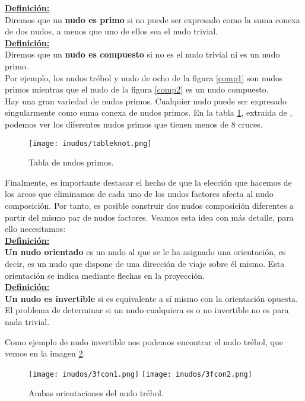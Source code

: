 \underline{\textbf{ Definición:}}\\
Diremos que un \textbf{nudo es primo} si no puede ser expresado como la suma conexa de dos nudos, a menos que uno de ellos sea el nudo trivial. \\

\underline{ \textbf{ Definición:}}\\
Diremos que un \textbf{nudo es compuesto} si no es el nudo trivial ni es un nudo primo.\\

Por ejemplo, los nudos trébol y nudo de ocho de la figura \ref{comp1} son nudos primos mientras que el nudo de la figura \ref{comp2} es un nudo compuesto. \\ 

Hay una gran variedad de nudos primos. Cualquier nudo puede ser expresado singularmente como suma conexa de nudos primos. En la tabla \ref{comp6}, extraida de \cite{10}, podemos ver los diferentes nudos primos que tienen menos de 8 cruces.\\
\begin{figure}[h!]
	\texttt{[image: inudos/tableknot.png]}
	\centering
	\caption{Tabla de nudos primos.}
	\label{comp6} 
\end{figure}




Finalmente, es importante destacar el hecho de que la elección que hacemos de los arcos que eliminamos de cada uno de los nudos factores afecta al nudo composición. Por tanto, es posible construir dos nudos composición diferentes a partir del mismo par de nudos factores. Veamos esta idea con más detalle, para ello necesitamos:\\

\underline{\textbf{ Definición:}}\\
\textbf{ Un nudo orientado} es un nudo al que se le ha asignado una orientación, es decir, es un nudo que dispone de una dirección de viaje sobre él mismo. Esta orientación se indica mediante flechas en la proyección. \\

\underline{\textbf{ Definición:}}\\
\textbf{ Un nudo es invertible} si es equivalente a sí mismo con la orientación opuesta. \\

El problema de determinar si un nudo cualquiera es o no invertible no es para nada trivial.

Como ejemplo de nudo invertible nos podemos encontrar el nudo trébol, que vemos en la imagen \ref{comp5}.\\
\begin{figure}[h!]
	\texttt{[image: inudos/3fcon1.png]}
	\texttt{[image: inudos/3fcon2.png]}
	\centering
	\caption{Ambas orientaciones del nudo trébol.}
	\label{comp5} 
\end{figure}

